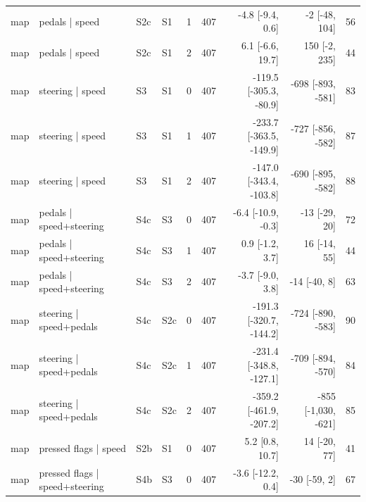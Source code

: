 \begin{table}[t]
\begin{tabular}{lllllrrrr}
map & pedals | speed & S2c & S1 & 1 & 407 & -4.8 [-9.4, 0.6] & -2 [-48, 104] & 56 \\
map & pedals | speed & S2c & S1 & 2 & 407 & 6.1 [-6.6, 19.7] & 150 [-2, 235] & 44 \\
map & steering | speed & S3 & S1 & 0 & 407 & -119.5 [-305.3, -80.9] & -698 [-893, -581] & 83 \\
map & steering | speed & S3 & S1 & 1 & 407 & -233.7 [-363.5, -149.9] & -727 [-856, -582] & 87 \\
map & steering | speed & S3 & S1 & 2 & 407 & -147.0 [-343.4, -103.8] & -690 [-895, -582] & 88 \\
map & pedals | speed+steering & S4c & S3 & 0 & 407 & -6.4 [-10.9, -0.3] & -13 [-29, 20] & 72 \\
map & pedals | speed+steering & S4c & S3 & 1 & 407 & 0.9 [-1.2, 3.7] & 16 [-14, 55] & 44 \\
map & pedals | speed+steering & S4c & S3 & 2 & 407 & -3.7 [-9.0, 3.8] & -14 [-40, 8] & 63 \\
map & steering | speed+pedals & S4c & S2c & 0 & 407 & -191.3 [-320.7, -144.2] & -724 [-890, -583] & 90 \\
map & steering | speed+pedals & S4c & S2c & 1 & 407 & -231.4 [-348.8, -127.1] & -709 [-894, -570] & 84 \\
map & steering | speed+pedals & S4c & S2c & 2 & 407 & -359.2 [-461.9, -207.2] & -855 [-1{,}030, -621] & 85 \\
map & pressed flags | speed & S2b & S1 & 0 & 407 & 5.2 [0.8, 10.7] & 14 [-20, 77] & 41 \\
map & pressed flags | speed+steering & S4b & S3 & 0 & 407 & -3.6 [-12.2, 0.4] & -30 [-59, 2] & 67 \\
\bottomrule\end{tabular}
\end{table}

